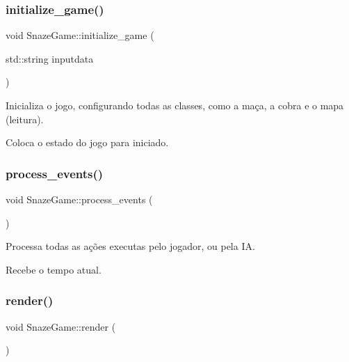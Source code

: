 \subsubsection{\texorpdfstring{initialize\+\_\+game()}{initialize\_game()}}
{\footnotesize\ttfamily void Snaze\+Game\+::initialize\+\_\+game (\begin{DoxyParamCaption}\item[{std\+::string}]{inputdata }\end{DoxyParamCaption})\hspace{0.3cm}{\ttfamily [inline]}}



Inicializa o jogo, configurando todas as classes, como a maça, a cobra e o mapa (leitura). 

Coloca o estado do jogo para iniciado. \mbox{\label{classSnazeGame_a8a9f2f626de17c2e592a579b15e1592f}} 
\subsubsection{\texorpdfstring{process\+\_\+events()}{process\_events()}}
{\footnotesize\ttfamily void Snaze\+Game\+::process\+\_\+events (\begin{DoxyParamCaption}{ }\end{DoxyParamCaption})\hspace{0.3cm}{\ttfamily [inline]}}



Processa todas as ações executas pelo jogador, ou pela IA. 

Recebe o tempo atual. \mbox{\label{classSnazeGame_a67f9c90252d094a048b1cda89f36b3a0}} 
\subsubsection{\texorpdfstring{render()}{render()}}
{\footnotesize\ttfamily void Snaze\+Game\+::render (\begin{DoxyParamCaption}{ }\end{DoxyParamCaption})\hspace{0.3cm}{\ttfamily [inline]}}



